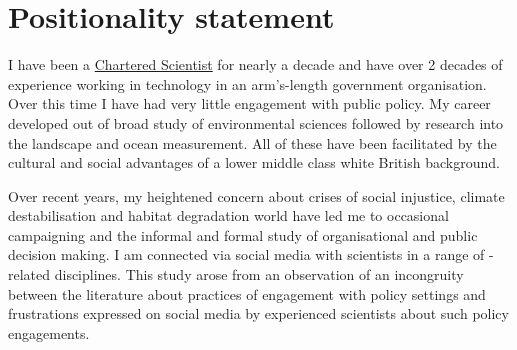 \section{Positionality statement}\label{sec:metpositionality}

I have been a \href{https://sciencecouncil.org/scientists-science-technicians/which-professional-award-is-right-for-me/csci/}{Chartered Scientist} for nearly a decade and have over 2 decades of experience working in technology in an arm's-length government organisation. Over this time I have had very little engagement with public policy. My career developed out of broad study of environmental sciences followed by research into the landscape and ocean measurement. All of these have been facilitated by the cultural and social advantages of a lower middle class white British background.

Over recent years, my heightened concern about crises of social injustice, climate destabilisation and habitat degradation world have led me to occasional campaigning and the informal and formal study of organisational and public decision making. I am connected via social media with scientists in a range of \CAN-related disciplines. This study arose from an observation of an incongruity between the literature about practices of engagement with policy settings and frustrations expressed on social media by experienced scientists about such policy engagements.



